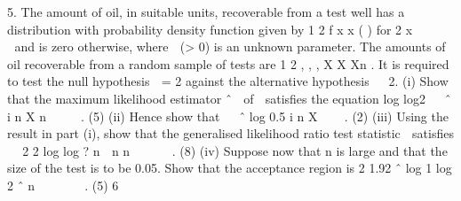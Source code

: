
5. The amount of oil, in suitable units, recoverable from a test well has a distribution
with probability density function given by
1
2
f x x ( ) for 2
x




 
and is zero otherwise, where  (> 0) is an unknown parameter. The amounts of oil
recoverable from a random sample of tests are
1 2 , , , X X Xn
. It is required to test
the null hypothesis  = 2 against the alternative hypothesis   2.
(i) Show that the maximum likelihood estimator
ˆ

of  satisfies the equation
log log2  
ˆ
i
n
X n

   .
(5)
(ii) Hence show that
 
ˆ
log 0.5 i
n
X
 

.
(2)
(iii) Using the result in part (i), show that the generalised likelihood ratio test
statistic  satisfies
 
2 2 log log ?
n
 n n
 
   .
(8)
(iv) Suppose now that n is large and that the size of the test is to be 0.05. Show that
the acceptance region is
2 1.92 ˆ
log 1 log 2 ˆ
n


    .
(5)
6
